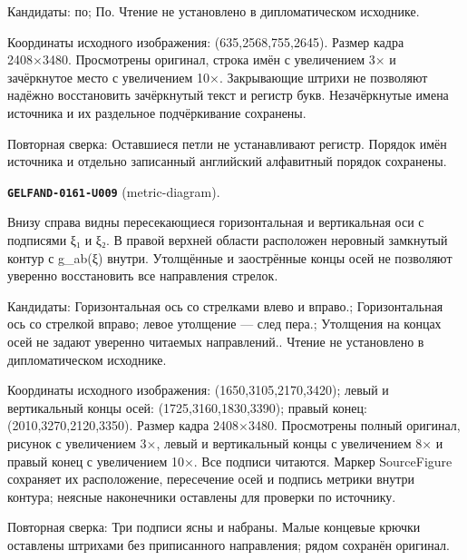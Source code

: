 Кандидаты: по; По. Чтение не установлено в дипломатическом исходнике.\par
Координаты исходного изображения: (635,2568,755,2645). Размер кадра 2408×3480. Просмотрены оригинал, строка имён с увеличением 3× и зачёркнутое место с увеличением 10×. Закрывающие штрихи не позволяют надёжно восстановить зачёркнутый текст и регистр букв. Незачёркнутые имена источника и их раздельное подчёркивание сохранены.\par
Повторная сверка: Оставшиеся петли не устанавливают регистр. Порядок имён источника и отдельно записанный английский алфавитный порядок сохранены.\par\medskip
\par\noindent\leavevmode{}\label{GELFAND-0161-U009}\label{GELFAND-P001486:metric-diagram}\textbf{\texttt{GELFAND-0161-U009}} (metric-diagram).\nopagebreak[4]\par
Внизу справа видны пересекающиеся горизонтальная и вертикальная оси с подписями ξ₁ и ξ₂. В правой верхней области расположен неровный замкнутый контур с g\_ab(ξ) внутри. Утолщённые и заострённые концы осей не позволяют уверенно восстановить все направления стрелок.\par
Кандидаты: Горизонтальная ось со стрелками влево и вправо.; Горизонтальная ось со стрелкой вправо; левое утолщение — след пера.; Утолщения на концах осей не задают уверенно читаемых направлений.. Чтение не установлено в дипломатическом исходнике.\par
Координаты исходного изображения: (1650,3105,2170,3420); левый и вертикальный концы осей: (1725,3160,1830,3390); правый конец: (2010,3270,2120,3350). Размер кадра 2408×3480. Просмотрены полный оригинал, рисунок с увеличением 3×, левый и вертикальный концы с увеличением 8× и правый конец с увеличением 10×. Все подписи читаются. Маркер SourceFigure сохраняет их расположение, пересечение осей и подпись метрики внутри контура; неясные наконечники оставлены для проверки по источнику.\par
Повторная сверка: Три подписи ясны и набраны. Малые концевые крючки оставлены штрихами без приписанного направления; рядом сохранён оригинал.\par\medskip
